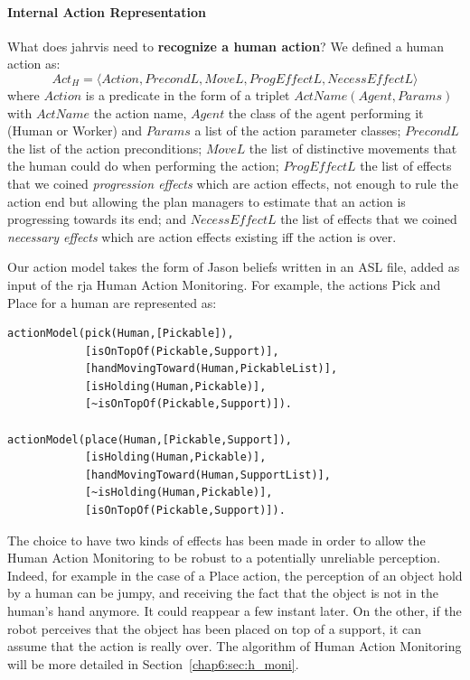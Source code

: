 \documentclass[a4paper,11pt,twoside]{StyleThese}
\begin{document}
\paragraph{Internal Action Representation}\label{chap6:par:act_rep}\mbox{}

\bigskip
What does \acrshort{jahrvis} need to \textbf{recognize a human action}? We defined a human action as: 
\[Act_H=\langle Action,PrecondL,MoveL,ProgEffectL,NecessEffectL\rangle\] where $Action$ is a predicate in the form of a triplet $ActName(Agent,Params)$ with $ActName$ the action name, $Agent$ the class of the agent performing it (\eg Human or Worker) and $Params$ a list of the action parameter classes; $PrecondL$ the list of the action preconditions; $MoveL$ the list of distinctive movements that the human could do when performing the action; $ProgEffectL$ the list of effects that we coined \textit{progression effects} which are action effects, not enough to rule the action end but allowing the plan managers to estimate that an action is progressing towards its end; and $NecessEffectL$ the list of effects that we coined \textit{necessary effects} which are action effects existing iff the action is over.

Our action model takes the form of Jason beliefs written in an ASL file, added as input of the \acrshort{rja} Human Action Monitoring. For example, the actions Pick and Place for a human are represented as:
\begin{lstlisting}[style=aslDef]
actionModel(pick(Human,[Pickable]),
			[isOnTopOf(Pickable,Support)],
			[handMovingToward(Human,PickableList)],
			[isHolding(Human,Pickable)],
			[~isOnTopOf(Pickable,Support)]).

actionModel(place(Human,[Pickable,Support]),
			[isHolding(Human,Pickable)],
			[handMovingToward(Human,SupportList)],
			[~isHolding(Human,Pickable)],
			[isOnTopOf(Pickable,Support)]).
\end{lstlisting}

The choice to have two kinds of effects has been made in order to allow the Human Action Monitoring to be robust to a potentially unreliable perception. Indeed, for example in the case of a Place action, the perception of an object hold by a human can be jumpy, and receiving the fact that the object is not in the human's hand anymore. It could reappear a few instant later. On the other, if the robot perceives that the object has been placed on top of a support, it can assume that the action is really over. The algorithm of Human Action Monitoring will be more detailed in Section~\ref{chap6:sec:h_moni}.
\end{document}
